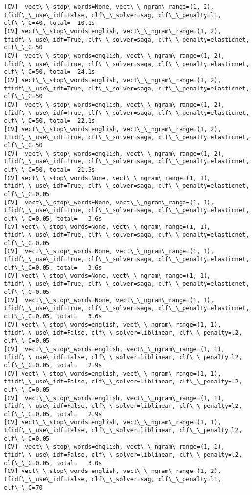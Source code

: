 \documentclass[11pt]{article}
\begin{document}
    \begin{Verbatim}[commandchars=\\\{\}]
[CV]  vect\_\_stop\_words=None, vect\_\_ngram\_range=(1, 2), tfidf\_\_use\_idf=False, clf\_\_solver=sag, clf\_\_penalty=l1, clf\_\_C=40, total=  10.1s
[CV] vect\_\_stop\_words=english, vect\_\_ngram\_range=(1, 2), tfidf\_\_use\_idf=True, clf\_\_solver=saga, clf\_\_penalty=elasticnet, clf\_\_C=50 
[CV]  vect\_\_stop\_words=english, vect\_\_ngram\_range=(1, 2), tfidf\_\_use\_idf=True, clf\_\_solver=saga, clf\_\_penalty=elasticnet, clf\_\_C=50, total=  24.1s
[CV] vect\_\_stop\_words=english, vect\_\_ngram\_range=(1, 2), tfidf\_\_use\_idf=True, clf\_\_solver=saga, clf\_\_penalty=elasticnet, clf\_\_C=50 
[CV]  vect\_\_stop\_words=english, vect\_\_ngram\_range=(1, 2), tfidf\_\_use\_idf=True, clf\_\_solver=saga, clf\_\_penalty=elasticnet, clf\_\_C=50, total=  22.1s
[CV] vect\_\_stop\_words=english, vect\_\_ngram\_range=(1, 2), tfidf\_\_use\_idf=True, clf\_\_solver=saga, clf\_\_penalty=elasticnet, clf\_\_C=50 
[CV]  vect\_\_stop\_words=english, vect\_\_ngram\_range=(1, 2), tfidf\_\_use\_idf=True, clf\_\_solver=saga, clf\_\_penalty=elasticnet, clf\_\_C=50, total=  21.5s
[CV] vect\_\_stop\_words=None, vect\_\_ngram\_range=(1, 1), tfidf\_\_use\_idf=True, clf\_\_solver=saga, clf\_\_penalty=elasticnet, clf\_\_C=0.05 
[CV]  vect\_\_stop\_words=None, vect\_\_ngram\_range=(1, 1), tfidf\_\_use\_idf=True, clf\_\_solver=saga, clf\_\_penalty=elasticnet, clf\_\_C=0.05, total=   3.6s
[CV] vect\_\_stop\_words=None, vect\_\_ngram\_range=(1, 1), tfidf\_\_use\_idf=True, clf\_\_solver=saga, clf\_\_penalty=elasticnet, clf\_\_C=0.05 
[CV]  vect\_\_stop\_words=None, vect\_\_ngram\_range=(1, 1), tfidf\_\_use\_idf=True, clf\_\_solver=saga, clf\_\_penalty=elasticnet, clf\_\_C=0.05, total=   3.6s
[CV] vect\_\_stop\_words=None, vect\_\_ngram\_range=(1, 1), tfidf\_\_use\_idf=True, clf\_\_solver=saga, clf\_\_penalty=elasticnet, clf\_\_C=0.05 
[CV]  vect\_\_stop\_words=None, vect\_\_ngram\_range=(1, 1), tfidf\_\_use\_idf=True, clf\_\_solver=saga, clf\_\_penalty=elasticnet, clf\_\_C=0.05, total=   3.6s
[CV] vect\_\_stop\_words=english, vect\_\_ngram\_range=(1, 1), tfidf\_\_use\_idf=False, clf\_\_solver=liblinear, clf\_\_penalty=l2, clf\_\_C=0.05 
[CV]  vect\_\_stop\_words=english, vect\_\_ngram\_range=(1, 1), tfidf\_\_use\_idf=False, clf\_\_solver=liblinear, clf\_\_penalty=l2, clf\_\_C=0.05, total=   2.9s
[CV] vect\_\_stop\_words=english, vect\_\_ngram\_range=(1, 1), tfidf\_\_use\_idf=False, clf\_\_solver=liblinear, clf\_\_penalty=l2, clf\_\_C=0.05 
[CV]  vect\_\_stop\_words=english, vect\_\_ngram\_range=(1, 1), tfidf\_\_use\_idf=False, clf\_\_solver=liblinear, clf\_\_penalty=l2, clf\_\_C=0.05, total=   2.9s
[CV] vect\_\_stop\_words=english, vect\_\_ngram\_range=(1, 1), tfidf\_\_use\_idf=False, clf\_\_solver=liblinear, clf\_\_penalty=l2, clf\_\_C=0.05 
[CV]  vect\_\_stop\_words=english, vect\_\_ngram\_range=(1, 1), tfidf\_\_use\_idf=False, clf\_\_solver=liblinear, clf\_\_penalty=l2, clf\_\_C=0.05, total=   3.0s
[CV] vect\_\_stop\_words=english, vect\_\_ngram\_range=(1, 2), tfidf\_\_use\_idf=False, clf\_\_solver=sag, clf\_\_penalty=l1, clf\_\_C=70 

    \end{Verbatim}
\end{document}
